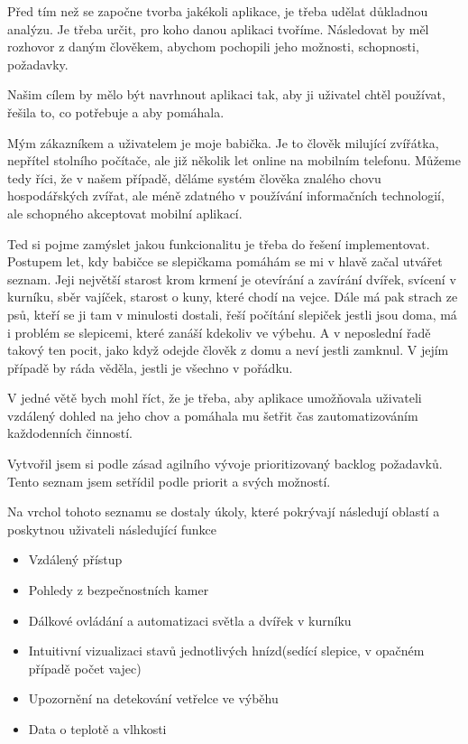 Před tím než se započne tvorba jakékoli aplikace, je třeba udělat důkladnou analýzu.
Je třeba určit, pro koho danou aplikaci tvoříme.
Následovat by měl rozhovor z daným člověkem, abychom pochopili jeho možnosti, schopnosti, požadavky.

Našim cílem by mělo být navrhnout aplikaci tak, aby ji uživatel chtěl používat, řešila to, co potřebuje a aby pomáhala.

Mým zákazníkem a uživatelem je moje babička.
Je to člověk milující zvířátka, nepřítel stolního počítače, ale již několik let online na mobilním telefonu.
Můžeme tedy říci, že v našem případě, děláme systém člověka znalého chovu hospodářských zvířat, ale méně zdatného v používání informačních technologií, ale schopného akceptovat mobilní aplikací.

Ted si pojme zamýslet jakou funkcionalitu je třeba do řešení implementovat.
Postupem let, kdy babičce se slepičkama pomáhám se mi v hlavě začal utvářet seznam.
Jeji největší starost krom krmení je otevírání a zavírání dvířek, svícení v kurníku, sběr vajíček, starost o kuny, které chodí na vejce.
Dále má pak strach ze psů, kteří se ji tam v minulosti dostali, řeší počítání slepiček jestli jsou doma, má i problém se slepicemi, které zanáší kdekoliv ve výbehu.
A v neposlední řadě takový ten pocit, jako když odejde člověk z domu a neví jestli zamknul.
V jejím případě by ráda věděla, jestli je všechno v pořádku.

V jedné větě bych mohl říct, že je třeba, aby aplikace umožňovala uživateli vzdálený dohled na jeho chov a pomáhala mu šetřit čas zautomatizováním každodenních činností.

Vytvořil jsem si podle zásad agilního vývoje  \cite{agile-manifesto} prioritizovaný backlog požadavků.
Tento seznam jsem setřídil podle priorit a svých možností.

Na vrchol tohoto seznamu se dostaly úkoly, které pokrývají následují oblastí a poskytnou uživateli následující funkce

\begin{itemize}
    \item Vzdálený přístup
    \item Pohledy z bezpečnostních kamer
    \item Dálkové ovládání a automatizaci světla a dvířek v kurníku
    \item Intuitivní vizualizaci stavů jednotlivých hnízd(sedící slepice, v opačném případě počet vajec)
    \item Upozornění na detekování vetřelce ve výběhu
    \item Data o teplotě a vlhkosti
\end{itemize}


\newpage